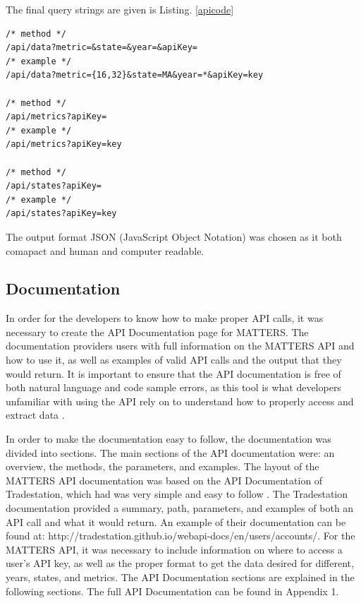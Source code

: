 			The final query strings are given is Listing. \ref{apicode}
			
			\begin{lstlisting}[frame=lines, caption={API methods examples}, label=apicode, backgroundcolor=\color{codegray}, emph={data,metrics, states},emphstyle=\underbar]
/* method */
/api/data?metric=&state=&year=&apiKey=
/* example */
/api/data?metric={16,32}&state=MA&year=*&apiKey=key

/* method */
/api/metrics?apiKey=
/* example */
/api/metrics?apiKey=key

/* method */
/api/states?apiKey=
/* example */
/api/states?apiKey=key
			\end{lstlisting}
			
			The output format JSON (JavaScript Object Notation) was chosen as it both comapact and human and computer readable. 
			
		\subsection{Documentation}
			
			In order for the developers to know how to make proper API calls, it was necessary to create the API Documentation page for MATTERS. The documentation providers users with full information on the MATTERS API and how to use it, as well as examples of valid API calls and the output that they would return. It is important to ensure that the API documentation is free of both natural language and code sample errors, as this tool is what developers unfamiliar with using the API rely on to understand how to properly access and extract data \cite{errors}. 
			
			In order to make the documentation easy to follow, the documentation was divided into sections. The main sections of the API documentation were: an overview, the methods, the parameters, and examples. The layout of the MATTERS API documentation was based on the API Documentation of Tradestation, which had was very simple and easy to follow \cite{apiex}. The Tradestation documentation provided a summary, path, parameters, and examples of both an API call and what it would return. An example of their documentation can be found at: http://tradestation.github.io/webapi-docs/en/users/accounts/. For the MATTERS API, it was necessary to include information on where to access a user’s API key, as well as the proper format to get the data desired for different, years, states, and metrics. The API Documentation sections are explained in the following sections. The full API Documentation can be found in Appendix 1.
			
